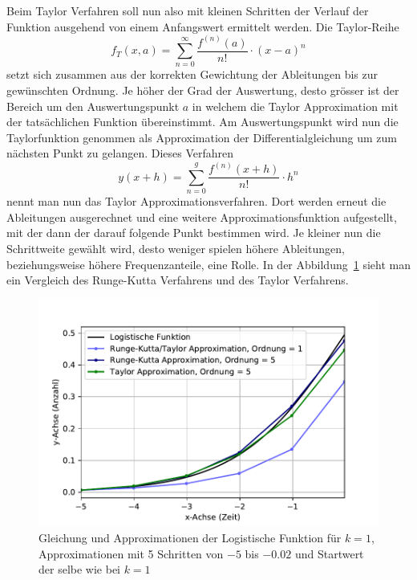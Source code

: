 Beim Taylor Verfahren soll nun also mit kleinen Schritten der Verlauf der Funktion ausgehend von einem Anfangswert ermittelt werden.
Die Taylor-Reihe
\begin{equation}
f_{T}(x,a)
=
\sum_{n=0}^{\infty}{\frac{f^{(n)}(a)}{n!}}\cdot (x-a)^{n}
\label{taylor:section:taylor}
\end{equation}
setzt sich zusammen aus der korrekten Gewichtung der Ableitungen bis zur gewünschten Ordnung.
Je höher der Grad der Auswertung, desto grösser ist der Bereich um den Auswertungspunkt $a$ in welchem die Taylor Approximation mit der tatsächlichen Funktion übereinstimmt.
Am Auswertungspunkt wird nun die Taylorfunktion genommen als Approximation der Differentialgleichung um zum nächsten Punkt zu gelangen.
Dieses Verfahren
\begin{equation}
y(x+h)
=
\sum_{n=0}^{g}{\frac{f^{(n)}(x+h)}{n!}}\cdot h^{n}
\label{taylor:section:taylorapproximation}
\end{equation}
nennt man nun das Taylor Approximationsverfahren.
Dort werden erneut die Ableitungen ausgerechnet und eine weitere Approximationsfunktion aufgestellt, mit der dann der darauf folgende Punkt bestimmen wird.
Je kleiner nun die Schrittweite gewählt wird, desto weniger spielen höhere Ableitungen, beziehungsweise höhere Frequenzanteile, eine Rolle.
In der Abbildung~\ref{taylor:section:fig:LogisticFunctionApproximation} sieht man ein Vergleich des Runge-Kutta Verfahrens und des Taylor Verfahrens.

\begin{figure}
	\begin{center}
	\includegraphics[width=12cm]{papers/taylor/taylorPictures/LogisticFunction.pdf}
	\caption{Gleichung und Approximationen der Logistische Funktion für $k=1$, Approximationen mit 5 Schritten von $-5$ bis $-0.02$ und Startwert der selbe wie bei $k=1$}
	\label{taylor:section:fig:LogisticFunctionApproximation}
	\end{center}
\end{figure}

